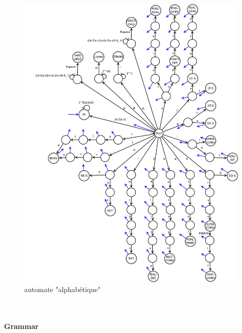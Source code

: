 \documentclass[a4paper,10pt]{article}
\begin{document}
  \begin{figure}[H] \hspace*{-2cm} 
    \centering
   	  \includegraphics[width=450pt]{automate2.pdf} 
			\caption{automate "alphabétique"}
			\label{automate2}
  \end{figure}	

\pagebreak
~\\
\paragraph{Grammar}
\end{document}
